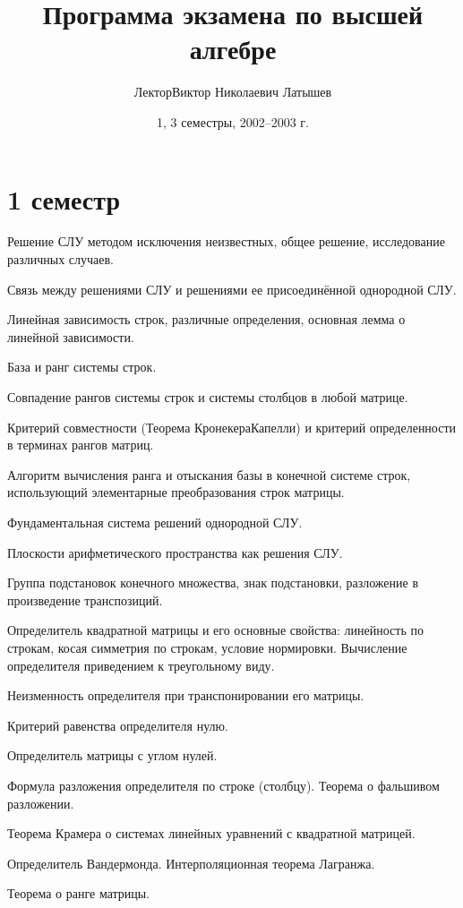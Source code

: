 \documentclass[a4paper]{article}
\title{Программа экзамена по высшей алгебре}
\author{Лектор\т Виктор Николаевич Латышев}
\date{1, 3 семестры, 2002--2003 г.}
\begin{document}
\maketitle

\section*{1 семестр}

\begin{nums}{-2}
\item Решение СЛУ методом исключения неизвестных, общее решение,
исследование различных случаев.
\item Связь между решениями СЛУ и решениями ее присоединённой однородной СЛУ.
\item Линейная зависимость строк, различные определения, основная лемма о линейной зависимости.
\item База и ранг системы строк.
\item Совпадение рангов системы строк и системы столбцов в любой матрице.
\item Критерий совместности (Теорема Кронекера\ч Капелли) и критерий определенности в терминах
рангов матриц.
\item Алгоритм вычисления ранга и отыскания базы в конечной системе строк, использующий
элементарные преобразования строк матрицы.
\item Фундаментальная система решений однородной СЛУ.
\item Плоскости арифметического пространства как решения СЛУ.
\item Группа подстановок конечного множества, знак подстановки, разложение в произведение
транспозиций.
\item Определитель квадратной матрицы и его основные свойства: линейность по строкам, косая
симметрия по строкам, условие нормировки. Вычисление определителя приведением к треугольному виду.
\item Неизменность определителя при транспонировании его матрицы.
\item Критерий равенства определителя нулю.
\item Определитель матрицы с углом нулей.
\item Формула разложения определителя по строке (столбцу). Теорема о фальшивом разложении.
\item Теорема Крамера о системах линейных уравнений с квадратной матрицей.
\item Определитель Вандермонда. Интерполяционная теорема Лагранжа.
\item Теорема о ранге матрицы.

\end{nums}
\end{document}
